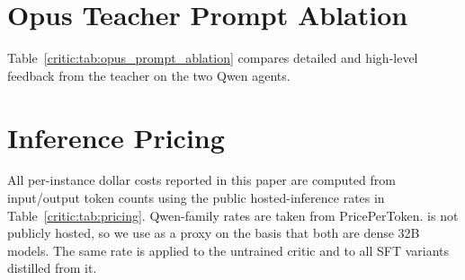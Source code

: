 \section{Opus Teacher Prompt Ablation}
\label{critic:app:opus_prompt_ablation}

Table~\ref{critic:tab:opus_prompt_ablation} compares detailed and high-level feedback from the \criticopus{} teacher on the two Qwen agents.

\begin{table}[t]
\centering
\small
\setlength{\tabcolsep}{5pt}
\caption{\criticopus{} teacher prompt comparison on SWE-Bench Verified (500 instances). \emph{Non-Loop} is the percentage of trajectories without three consecutive repetitions of the same Bash command. Total cost is per-instance agent-plus-critic cost. Bold marks the better percentage metric within each agent; ties are unbolded.}
\label{critic:tab:opus_prompt_ablation}
\end{table}

\section{Inference Pricing}
\label{critic:app:pricing}

All per-instance dollar costs reported in this paper are computed from input/output token counts using the public hosted-inference rates in Table~\ref{critic:tab:pricing}. Qwen-family rates are taken from PricePerToken. \criticcwm{} is not publicly hosted, so we use \criticqwenThirtyTwoB{} as a proxy on the basis that both are dense 32B models. The same \criticqwenEightB{} rate is applied to the untrained \criticqwenEightB{} critic and to all \criticqwenEightB{} SFT variants distilled from it.

